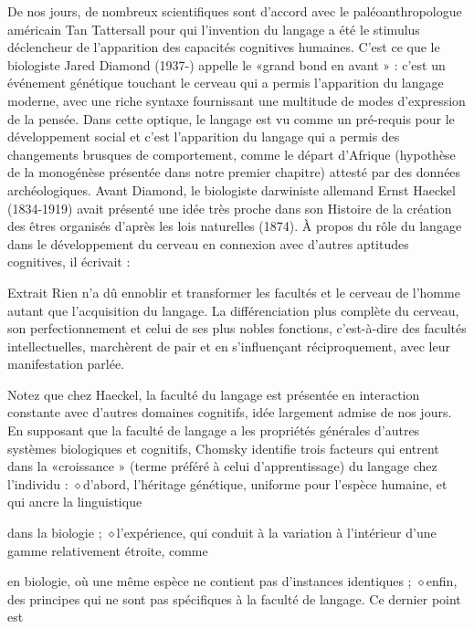 De nos jours, de nombreux scientifiques sont d'accord avec le paléoanthropologue américain
Tan Tattersall pour qui l'invention du langage a été le stimulus déclencheur de l'apparition des
capacités cognitives humaines. C’est ce que le biologiste Jared Diamond (1937-) appelle le
«grand bond en avant » : c’est un événement génétique touchant le cerveau qui a permis l'apparition
du langage moderne, avec une riche syntaxe fournissant une multitude de modes d'expression
de la pensée. Dans cette optique, le langage est vu comme un pré-requis pour le développement
social et c'est l'apparition du langage qui a permis des changements brusques de comportement,
comme le départ d'Afrique (hypothèse de la monogénèse présentée dans notre premier chapitre)
attesté par des données archéologiques. Avant Diamond, le biologiste darwiniste allemand Ernst
Haeckel (1834-1919) avait présenté une idée très proche dans son Histoire de la création des êtres
organisés d'après les lois naturelles (1874). À propos du rôle du langage dans le développement
du cerveau en connexion avec d'autres aptitudes cognitives, il écrivait :
\begin{lecture}{Extrait}
Rien n'a dû ennoblir et transformer les facultés et le cerveau de l'homme autant que l'acquisition du langage. La différenciation plus complète du cerveau, son perfectionnement et celui de ses plus nobles fonctions, c'est-à-dire des facultés intellectuelles, marchèrent de pair et en s’influençant réciproquement, avec leur manifestation parlée.
\end{lecture}
Notez que chez Haeckel, la faculté du langage est présentée en interaction constante avec d’autres
domaines cognitifs, idée largement admise de nos jours.
En supposant que la faculté de langage a les propriétés générales d'autres systèmes biologiques et
cognitifs, Chomsky identifie trois facteurs qui entrent dans la «croissance » (terme préféré à celui
d'apprentissage) du langage chez l'individu :
\noindent\textcolor{BellaTeal}{$\diamond$}\enspace d'abord, l'héritage génétique, uniforme pour l'espèce humaine, et qui ancre la linguistique\par
dans la biologie ;
\noindent\textcolor{BellaTeal}{$\diamond$}\enspace l'expérience, qui conduit à la variation à l'intérieur d’une gamme relativement étroite, comme\par
en biologie, où une même espèce ne contient pas d'instances identiques ;
\noindent\textcolor{BellaTeal}{$\diamond$}\enspace enfin, des principes qui ne sont pas spécifiques à la faculté de langage. Ce dernier point est\par
